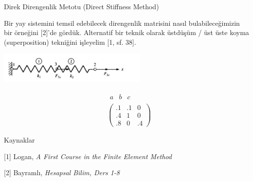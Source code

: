 \documentclass[12pt,fleqn]{article}\usepackage{../../common}
\begin{document}
Direk Direngenlik Metotu (Direct Stiffness Method)

Bir yay sistemini temsil edebilecek direngenlik matrisini nasıl
bulabileceğimizin bir örneğini [2]'de gördük. Alternatif bir
teknik olarak üstdüşüm / üst üste koyma (superposition) tekniğini
işleyelim [1, sf. 38]. 

\includegraphics[width=20em]{compscieng_bpp35stiff01_01.jpg}


$$
\begin{array}{cc} & \begin{array}{ccc} a & b & c \end{array} \\ &
\left(
\begin{array}{ccc}
.1 & .1 & 0 \\
.4 & 1 & 0 \\
.8 & 0 & .4
\end{array}
\right)
\end{array}
$$

Kaynaklar

[1] Logan, {\em A First Course in the Finite Element Method}

[2] Bayramlı, {\em Hesapsal Bilim, Ders 1-8}
\end{document}
